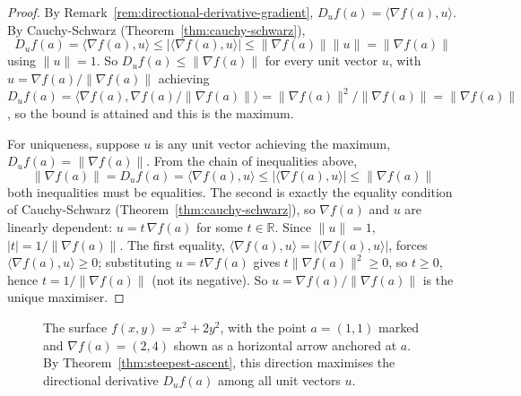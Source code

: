 		\begin{proof}
			By Remark~\ref{rem:directional-derivative-gradient}, $D_uf(a) = \langle \nabla f(a), u\rangle$. By Cauchy-Schwarz (Theorem~\ref{thm:cauchy-schwarz}),
			\[
				D_uf(a) = \langle \nabla f(a), u \rangle \le |\langle \nabla f(a), u\rangle| \le \|\nabla f(a)\|\|u\| = \|\nabla f(a)\|
			\]
			using $\|u\|=1$. So $D_uf(a) \le \|\nabla f(a)\|$ for every unit vector $u$, with $u=\nabla f(a)/\|\nabla f(a)\|$ achieving $D_uf(a) = \langle \nabla f(a), \nabla f(a)/\|\nabla f(a)\|\rangle = \|\nabla f(a)\|^2/\|\nabla f(a)\| = \|\nabla f(a)\|$, so the bound is attained and this is the maximum.
			
			For uniqueness, suppose $u$ is any unit vector achieving the maximum, $D_uf(a) = \|\nabla f(a)\|$. From the chain of inequalities above,
			\[
				\|\nabla f(a)\| = D_uf(a) = \langle\nabla f(a),u\rangle \le |\langle\nabla f(a),u\rangle| \le \|\nabla f(a)\|
			\]
			both inequalities must be equalities. The second is exactly the equality condition of Cauchy-Schwarz (Theorem~\ref{thm:cauchy-schwarz}), so $\nabla f(a)$ and $u$ are linearly dependent: $u = t\,\nabla f(a)$ for some $t\in\mathbb{R}$. Since $\|u\|=1$, $|t|=1/\|\nabla f(a)\|$. The first equality, $\langle\nabla f(a),u\rangle = |\langle\nabla f(a),u\rangle|$, forces $\langle\nabla f(a),u\rangle\ge0$; substituting $u=t\nabla f(a)$ gives $t\|\nabla f(a)\|^2\ge0$, so $t\ge0$, hence $t=1/\|\nabla f(a)\|$ (not its negative). So $u=\nabla f(a)/\|\nabla f(a)\|$ is the unique maximiser.
		\end{proof}
		
		\begin{figure}[h]
			\centering
			\caption{The surface $f(x,y)=x^2+2y^2$, with the point $a=(1,1)$ marked and $\nabla f(a)=(2,4)$ shown as a horizontal arrow anchored at $a$. By Theorem~\ref{thm:steepest-ascent}, this direction maximises the directional derivative $D_uf(a)$ among all unit vectors $u$.}
			\label{fig:steepest-ascent}
		\end{figure}
	
